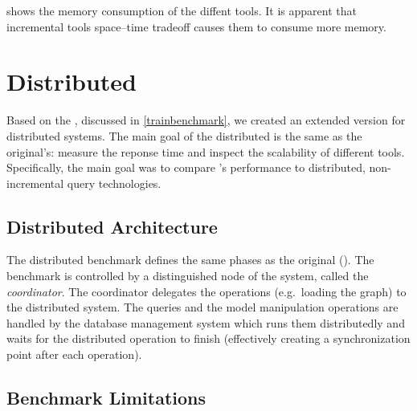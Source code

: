  shows the memory consumption of the diffent tools. It is apparent that incremental tools space--time tradeoff causes them to consume more memory.



\section{Distributed \tb{}}
\label{distributed-trainbenchmark}


Based on the \tb{}, discussed in \autoref{trainbenchmark}, we created an extended version for distributed systems. The main goal of the distributed \tb{} is the same as the original's: measure the reponse time and inspect the scalability of different tools. Specifically, the main goal was to compare \iqd{}'s performance to distributed, non-incremental query technologies.

\subsection{Distributed Architecture}

The distributed benchmark defines the same phases as the original \tb{} (). The benchmark is controlled by a distinguished node of the system, called the \emph{coordinator}. The coordinator delegates the operations (e.g.\ loading the graph) to the distributed system. The queries and the model manipulation operations are handled by the database management system which runs them distributedly and waits for the distributed operation to finish (effectively creating a synchronization point after each operation). 

\subsection{Benchmark Limitations}

